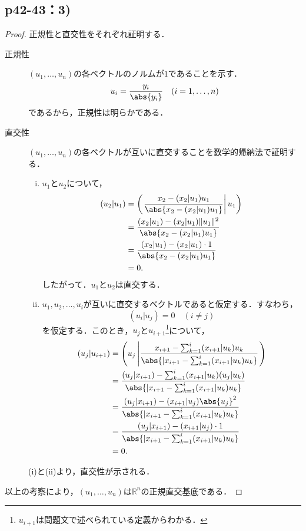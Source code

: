\documentclass[a4paper,10pt,fleqn]{ltjsarticle}
\begin{document}
\subsection*{p42-43：3)}


\begin{tleftbar}
\begin{proof}
  正規性と直交性をそれぞれ証明する．
  \begin{description}
  \item[正規性] $(u_1, \ldots, u_n)$の各ベクトルのノルムが$1$であることを示す．
  \[
    u_i = \frac{y_i}{\abs{y_i}} \quad (i = 1, \ldots, n)
  \]
  であるから，正規性は明らかである．
\item[直交性] $(u_1, \ldots, u_n)$の各ベクトルが互いに直交することを数学的帰納法で証明する．
\begin{enumerate}[(i)]
    \item $u_1$と$u_2$について，
    \begin{align*}
    (u_2 | u_1) &= \left(\left. \frac{x_2 - (x_2 | u_1) u_1}{\abs{ x_2 - (x_2 | u_1) u_1 }} \right|u_1 \right) \\
    &= \frac{(x_2 | u_1) - (x_2 | u_1) \|u_1\|^2}{\abs{ x_2 - (x_2 | u_1) u_1 }} \\
    &= \frac{(x_2 | u_1) - (x_2 | u_1) \cdot 1}{\abs{ x_2 - (x_2 | u_1) u_1 }} \\
    &= 0.
    \end{align*}
    したがって．$u_1$と$u_2$は直交する．
    
    \item $u_1, u_2, \ldots, u_i$が互いに直交するベクトルであると仮定する．すなわち，
    \[
      (u_i | u_j) = 0 \quad (i \ne j)
    \]
    を仮定する．このとき，$u_j$と$u_{i+1}$\footnote{$u_{i+1}$は問題文で述べられている定義からわかる．}について，
    \begin{align*}
    (u_j | u_{i+1}) &=\left  ( u_j \left| \frac{x_{i+1} - \sum_{k=1}^{i} (x_{i+1} | u_k) u_k}{\abs{| x_{i+1} - \sum_{k=1}^{i} (x_{i+1} | u_k) u_k }} \right. \right) \\
    &= \frac{(u_j | x_{i+1}) - \sum_{k=1}^{i} (x_{i+1} | u_k) (u_j | u_k)}{\abs{| x_{i+1} - \sum_{k=1}^{i} (x_{i+1} | u_k) u_k }} \\
    &= \frac{(u_j | x_{i+1}) - (x_{i+1} | u_j) \abs{u_j}^2}{\abs{| x_{i+1} - \sum_{k=1}^{i} (x_{i+1} | u_k) u_k }} \\
    &= \frac{(u_j | x_{i+1}) - (x_{i+1} | u_j) \cdot 1}{\abs{| x_{i+1} - \sum_{k=1}^{i} (x_{i+1} | u_k) u_k }} \\
    &= 0.
    \end{align*}
\end{enumerate}
(i)と(ii)より，直交性が示される．
\end{description}
以上の考察により，$(u_1, \ldots, u_n)$は$\mathbb{R}^n$の正規直交基底である．
\end{proof}
\end{tleftbar}
\end{document}
